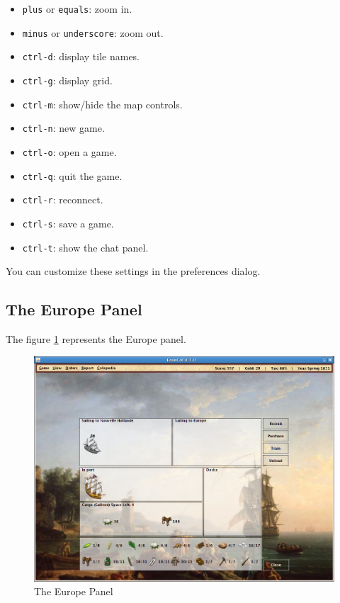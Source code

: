 \documentclass[12pt]{article}
\begin{document}
\begin{itemize}
\item\verb$plus$ or \verb$equals$: zoom in.
\item\verb$minus$ or \verb$underscore$: zoom out.
\item\verb$ctrl-d$: display tile names.
\item\verb$ctrl-g$: display grid.
\item\verb$ctrl-m$: show/hide the map controls.
\item\verb$ctrl-n$: new game.
\item\verb$ctrl-o$: open a game.
\item\verb$ctrl-q$: quit the game.
\item\verb$ctrl-r$: reconnect.
\item\verb$ctrl-s$: save a game.
\item\verb$ctrl-t$: show the chat panel.
\end{itemize}

You can customize these settings in the preferences dialog.


\hypertarget{europe panel}{\subsection{The Europe Panel}}

The figure \ref{europe_panel_fig} represents the Europe panel.
\begin{figure}[htb]
  \begin{center}
    \includegraphics[scale=0.35]{images/europe_panel.png}
    \caption{The Europe Panel\label{europe_panel_fig}}
  \end{center}
\end{figure}
\end{document}
